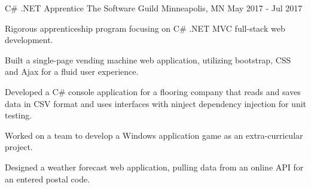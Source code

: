 \begin{cventries}
  \cventry
    {C\# .NET Apprentice}
    {The Software Guild}
    {Minneapolis, MN}
    {May 2017 - Jul 2017}
    {
      \begin{cvitems}
       \item {Rigorous apprenticeship program focusing on C\# .NET MVC full-stack web development.}
       \item {Built a single-page vending machine web application, utilizing bootstrap, CSS and Ajax for a fluid user experience.}
       \item {Developed a C\# console application for a flooring company that reads and saves data in CSV format and uses interfaces with ninject dependency injection for unit testing.}
       \item {Worked on a team to develop a Windows application game as an extra-curricular project.}
       \item {Designed a weather forecast web application, pulling data from an online API for an entered postal code.}
      \end{cvitems}
    }{}{}



\end{cventries}
